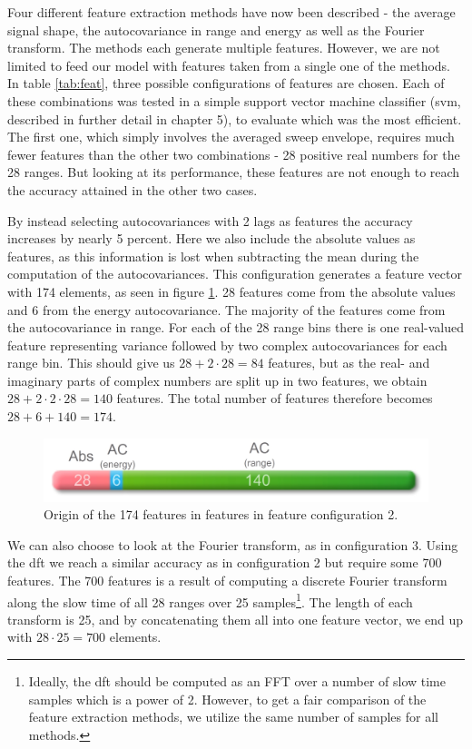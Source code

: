 Four different feature extraction methods have now been described - the average signal shape, the autocovariance in range and energy as well as the Fourier transform. The methods each generate multiple features. However, we are not limited to feed our model with features taken from a single one of the methods. In table \ref{tab:feat}, three possible configurations of features are chosen. Each of these combinations was tested in a simple support vector machine classifier (\gls{svm}, described in further detail in chapter 5), to evaluate which was the most efficient. The first one, which simply involves the averaged sweep envelope, requires much fewer features than the other two combinations - 28 positive real numbers for the 28 ranges. But looking at its performance, these features are not enough to reach the accuracy attained in the other two cases. 

By instead selecting autocovariances with 2 lags as features the accuracy increases by nearly 5 percent. Here we also include the absolute values as features, as this information is lost when subtracting the mean during the computation of the autocovariances. This configuration generates a feature vector with 174 elements, as seen in figure \ref{fig:feat_fig}. 28 features come from the absolute values and 6 from the energy autocovariance. The majority of the features come from the autocovariance in range. For each of the 28 range bins there is one real-valued feature representing variance followed by two complex autocovariances for each range bin. This should give us $28+2\cdot 28=84$ features, but as the real- and imaginary parts of complex numbers are split up in two features, we obtain $28+2\cdot2\cdot 28=140$ features. The total number of features therefore becomes $28+6+140=174$.

\begin{figure}[h]
	\centering
	\includegraphics[scale=0.8]{figs_temp/features.jpg}
	\caption{Origin of the 174 features in features in feature configuration 2.}
	\label{fig:feat_fig}
\end{figure}

We can also choose to look at the Fourier transform, as in configuration 3. Using the \gls{dft} we reach a similar accuracy as in configuration 2 but require some 700 features. The 700 features is a result of computing a discrete Fourier transform along the slow time of all 28 ranges over 25 samples\footnote{Ideally, the \gls{dft} should be computed as an FFT over a number of slow time samples which is a power of 2. However, to get a fair comparison of the feature extraction methods, we utilize the same number of samples for all methods.}. The length of each transform is 25, and by concatenating them all into one feature vector, we end up with $28\cdot 25=700$ elements. 

